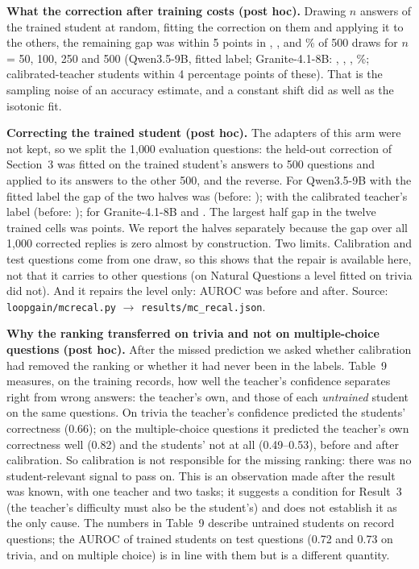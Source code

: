 \documentclass[10pt]{article}
\begin{document}
\textbf{What the correction after training costs (post hoc).} Drawing $n$ answers of the trained student at random, fitting the correction on them and applying it to the others, the remaining gap was within 5 points in \nQScalCostFifty{}, \nQScalCostHundred{}, \nQScalCostTwoFifty{} and \nQScalCostFiveHundred{}\% of 500 draws for $n$ = 50, 100, 250 and 500 (Qwen3.5-9B, fitted label; Granite-4.1-8B: \nGScalCostFifty{}, \nGScalCostHundred{}, \nGScalCostTwoFifty{}, \nGScalCostFiveHundred{}\%; calibrated-teacher students within 4 percentage points of these). That is the sampling noise of an accuracy estimate, and a constant shift did as well as the isotonic fit.

\textbf{Correcting the trained student (post hoc).} The adapters of this arm were not kept, so we split the 1{,}000 evaluation questions: the held-out correction of Section~3 was fitted on the trained student's answers to 500 questions and applied to its answers to the other 500, and the reverse. For Qwen3.5-9B with the fitted label the gap of the two halves was \mQScalRecalHalves{} (before: \mQScalGap{}); with the calibrated teacher's label \mQTcalRecalHalves{} (before: \mQTcalGap{}); for Granite-4.1-8B \mGScalRecalHalves{} and \mGTcalRecalHalves{}. The largest half gap in the twelve trained cells was \mRecalMaxHalf{} points. We report the halves separately because the gap over all 1{,}000 corrected replies is zero almost by construction. Two limits. Calibration and test questions come from one draw, so this shows that the repair is available here, not that it carries to other questions (on Natural Questions a level fitted on trivia did not). And it repairs the level only: AUROC was \mQScalAuroc{} before and \mQScalRecalAuroc{} after. Source: \texttt{loopgain/mcrecal.py} $\to$ \texttt{results/mc\_recal.json}.

\textbf{Why the ranking transferred on trivia and not on multiple-choice questions (post hoc).} After the missed prediction we asked whether calibration had removed the ranking or whether it had never been in the labels. Table~9 measures, on the training records, how well the teacher's confidence separates right from wrong answers: the teacher's own, and those of each \emph{untrained} student on the same questions. On trivia the teacher's confidence predicted the students' correctness (0.66); on the multiple-choice questions it predicted the teacher's own correctness well (0.82) and the students' not at all (0.49--0.53), before and after calibration. So calibration is not responsible for the missing ranking: there was no student-relevant signal to pass on. This is an observation made after the result was known, with one teacher and two tasks; it suggests a condition for Result~3 (the teacher's difficulty must also be the student's) and does not establish it as the only cause. The numbers in Table~9 describe untrained students on record questions; the AUROC of trained students on test questions (0.72 and 0.73 on trivia, \mQTcalAuroc{} and \mGTcalAuroc{} on multiple choice) is in line with them but is a different quantity.
\end{document}
